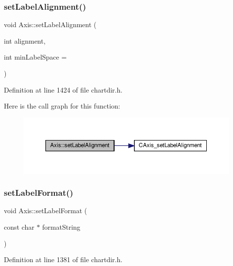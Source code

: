 \subsubsection{\texorpdfstring{set\+Label\+Alignment()}{setLabelAlignment()}}
{\footnotesize\ttfamily void Axis\+::set\+Label\+Alignment (\begin{DoxyParamCaption}\item[{int}]{alignment,  }\item[{int}]{min\+Label\+Space = {} }\end{DoxyParamCaption})\hspace{0.3cm}{\ttfamily [inline]}}



Definition at line 1424 of file chartdir.\+h.

Here is the call graph for this function\+:
\nopagebreak
\begin{figure}[H]
\begin{center}
\leavevmode
\includegraphics[width=350pt]{class_axis_af739ec5f1ef674cec9d425505451096e_cgraph}
\end{center}
\end{figure}
\mbox{\label{class_axis_a99c109ddb7e61206f7a8f1883d3e7a85}} 
\subsubsection{\texorpdfstring{set\+Label\+Format()}{setLabelFormat()}}
{\footnotesize\ttfamily void Axis\+::set\+Label\+Format (\begin{DoxyParamCaption}\item[{const char $\ast$}]{format\+String }\end{DoxyParamCaption})\hspace{0.3cm}{\ttfamily [inline]}}



Definition at line 1381 of file chartdir.\+h.

